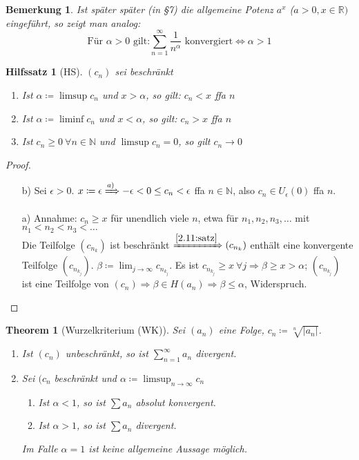 \documentclass[titlepage,ngerman,a4paper,headsepline]{scrartcl}
\newcommand{\N}{\mathbb{N}}
\newcommand{\R}{\mathbb{R}}
\theoremstyle{named}
\newtheorem{namedtheorem}{Theorem} \counterwithin{namedtheorem}{section}
\theoremstyle{dotless}
\newtheorem*{bemerkung}{Bemerkung}
\newtheorem*{hilfssatz*}{Hilfssatz}
\begin{document}
\begin{bemerkung}
	Ist später später (in \S 7) die allgemeine Potenz $a^{x}$ ($a > 0, x \in \R)$ eingeführt, so zeigt man analog:
	$$ \text{Für } \alpha > 0 \text{ gilt:} \sum_{n=1}^{\infty} \frac{1}{n^{\alpha}} \text{ konvergiert} \iff \alpha > 1 $$
\end{bemerkung}


\begin{hilfssatz*}[HS]
	$(c_{n})$ sei beschränkt
	\begin{enumerate}
		\item Ist $\alpha \coloneqq \limsup c_{n}$ und $x > \alpha$, so gilt: $c_{n} < x$ ffa $n$
		\item Ist $\alpha \coloneqq \liminf c_{n}$ und $x < \alpha$, so gilt: $c_{n} > x$ ffa $n$
		\item Ist $c_{n} \geq 0 ~\forall n \in \N$ und $\limsup c_{n} = 0$, so gilt $c_{n} \rightarrow 0$
	\end{enumerate}
\end{hilfssatz*}

\begin{proof} ~\
	\begin{enumerate}
		\item[b)] Sei $\epsilon > 0$. $x \coloneqq \epsilon \xRightarrow[]{a)} -\epsilon < 0 \leq c_{n} < \epsilon$ ffa $n \in \N$, also $c_{n} \in U_{\epsilon}(0)$ ffa $n$.
		\item[a)] Annahme: $c_{n} \geq x$ für unendlich viele $n$, etwa für $n_{1}, n_{2}, n_{3}, \dotsc$ mit $n_{1} < n_{2} < n_{3} < \dotsc$ \\
		 Die Teilfolge $(c_{n_{k}})$ ist beschränkt $\xRightarrow[]{\ref{2.11:satz}} (c_{n_{k}})$ enthält eine konvergente Teilfolge $(c_{n_{k_{j}}})$. $\beta \coloneqq \lim_{j\rightarrow \infty} c_{n_{k_{j}}}$. Es ist $c_{n_{k_{j}}} \geq x ~\forall j \Rightarrow \beta \geq x > \alpha$; $(c_{n_{k_{j}}})$ ist eine Teilfolge von $(c_{n}) \Rightarrow \beta \in H(a_{n}) \Rightarrow \beta \leq \alpha$, Widerspruch.
	\end{enumerate}	
\end{proof}

\begin{namedtheorem}[Wurzelkriterium (WK)] \label{3.6:prop-Wurzelkriterium}
	Sei $(a_{n})$ eine Folge, $c_{n} \coloneqq \sqrt[n]{|a_{n}|}$.
	\begin{enumerate}
		\item Ist $(c_{n})$ unbeschränkt, so ist $\sum_{n=1}^{\infty} a_{n}$ divergent.
		\item Sei $(c_{n}$ beschränkt und $\alpha \coloneqq \limsup_{n \rightarrow \infty} c_{n}$
			\begin{enumerate}
				\item Ist $\alpha < 1$, so ist $\sum a_{n}$ absolut konvergent.
				\item Ist $\alpha > 1$, so ist $\sum a_{n}$ divergent.
			\end{enumerate}
			Im Falle $\alpha = 1$ ist keine allgemeine Aussage möglich.
	\end{enumerate}
\end{namedtheorem}
\end{document}
